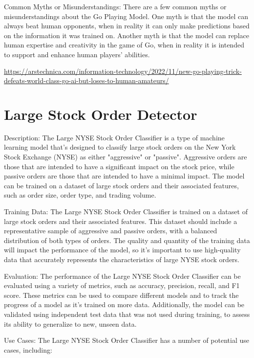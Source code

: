Common Myths or Misunderstandings:
There are a few common myths or misunderstandings about the Go Playing Model. One myth is that the model can always beat human opponents, when in reality it can only make predictions based on the information it was trained on. Another myth is that the model can replace human expertise and creativity in the game of Go, when in reality it is intended to support and enhance human players' abilities.

\url{https://arstechnica.com/information-technology/2022/11/new-go-playing-trick-defeats-world-class-go-ai-but-loses-to-human-amateurs/}

\section{Large Stock Order Detector}

Description:
The Large NYSE Stock Order Classifier is a type of machine learning model that's designed to classify large stock orders on the New York Stock Exchange (NYSE) as either "aggressive" or "passive". Aggressive orders are those that are intended to have a significant impact on the stock price, while passive orders are those that are intended to have a minimal impact. The model can be trained on a dataset of large stock orders and their associated features, such as order size, order type, and trading volume.

Training Data:
The Large NYSE Stock Order Classifier is trained on a dataset of large stock orders and their associated features. This dataset should include a representative sample of aggressive and passive orders, with a balanced distribution of both types of orders. The quality and quantity of the training data will impact the performance of the model, so it's important to use high-quality data that accurately represents the characteristics of large NYSE stock orders.

Evaluation:
The performance of the Large NYSE Stock Order Classifier can be evaluated using a variety of metrics, such as accuracy, precision, recall, and F1 score. These metrics can be used to compare different models and to track the progress of a model as it's trained on more data. Additionally, the model can be validated using independent test data that was not used during training, to assess its ability to generalize to new, unseen data.

Use Cases:
The Large NYSE Stock Order Classifier has a number of potential use cases, including:

